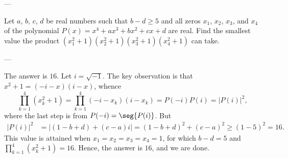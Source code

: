 
---

Let $a$, $b$, $c$, $d$ be real numbers such that $b-d\ge5$ and all zeros $x_1$, $x_2$, $x_3$, and $x_4$ of the polynomial $P(x)=x^4+ax^3+bx^2+cx+d$ are real. Find the smallest value the product $(x_1^2+1)(x_2^2+1)(x_3^2+1)(x_4^2+1)$ can take.

---

The answer is $\boxed{16}$. Let $i=\sqrt{-1}$. The key observation is that $x^2+1=(-i-x)(i-x)$, whence \[\prod_{k=1}^4\left(x_k^2+1\right)=\prod_{k=1}^4(-i-x_k)(i-x_k)=P(-i)P(i)=|P(i)|^2,\]
where the last step is from $P(-i)=\seg{P(i)}$. But
\begin{align*}
|P(i)|^2&=|(1-b+d)+(c-a)i|=(1-b+d)^2+(c-a)^2\ge(1-5)^2=16.
\end{align*}
This value is attained when $x_1=x_2=x_3=x_4=1$, for which $b-d=5$ and $\prod_{k=1}^4\left(x_k^2+1\right)=16$. Hence, the answer is $16$, and we are done.
